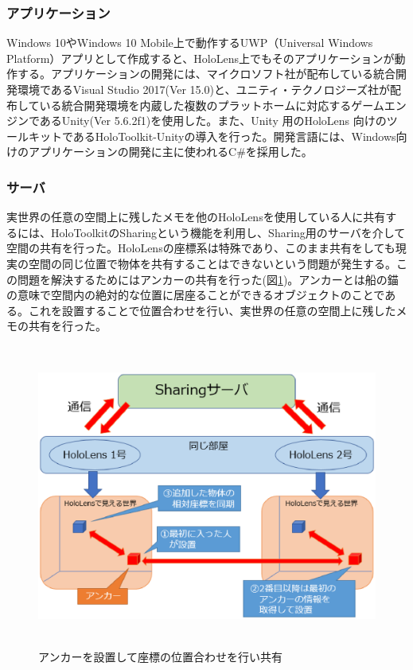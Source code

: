 \documentclass[11pt,a4j, titlepage]{jarticle} %
\begin{document}
\subsubsection{アプリケーション}
Windows 10やWindows 10 Mobile上で動作するUWP（Universal Windows Platform）アプリとして作成すると、HoloLens上でもそのアプリケーションが動作する。アプリケーションの開発には、マイクロソフト社が配布している統合開発環境であるVisual Studio 2017\cite{visualstudio}(Ver 15.0)と、ユニティ・テクノロジーズ社が配布している統合開発環境を内蔵した複数のプラットホームに対応するゲームエンジンであるUnity\cite{unity}(Ver 5.6.2f1)を使用した。また、Unity 用のHoloLens 向けのツールキットであるHoloToolkit-Unity\cite{holotoolkit}の導入を行った。開発言語には、Windows向けのアプリケーションの開発に主に使われるC\#を採用した。

\subsubsection{サーバ}
実世界の任意の空間上に残したメモを他のHoloLensを使用している人に共有するには、HoloToolkitのSharing\cite{sharing}という機能を利用し、Sharing用のサーバを介して空間の共有を行った。HoloLensの座標系は特殊であり、このまま共有をしても現実の空間の同じ位置で物体を共有することはできないという問題が発生する。この問題を解決するためにはアンカーの共有を行った(図\ref{fig:sharing})。アンカーとは船の錨の意味で空間内の絶対的な位置に居座ることができるオブジェクトのことである。これを設置することで位置合わせを行い、実世界の任意の空間上に残したメモの共有を行った。

\begin{figure}[H]
  \begin{center}
    \includegraphics[clip,height=10.0cm,width=14.0cm]{./sharing.eps}
    \caption{アンカーを設置して座標の位置合わせを行い共有}
    \label{fig:sharing}
  \end{center}
\end{figure}
\end{document}
